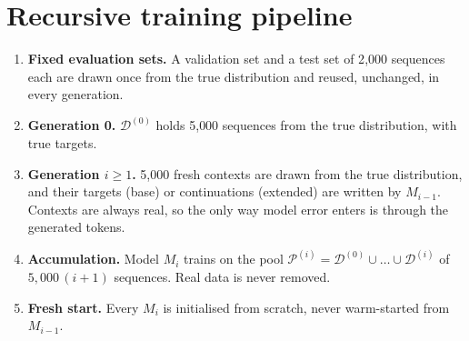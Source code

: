 \documentclass[11pt,a4paper]{article}
\newcommand{\data}[1]{\mathcal{D}^{(#1)}}
\newcommand{\pool}[1]{\mathcal{P}^{(#1)}}
\begin{document}
\section{Recursive training pipeline}\label{sec:pipeline}

\begin{enumerate}[leftmargin=1.6em]
  \item \textbf{Fixed evaluation sets.} A validation set and a test set of
        2{,}000 sequences each are drawn once from the true distribution and
        reused, unchanged, in every generation.
  \item \textbf{Generation 0.} $\data{0}$ holds 5{,}000 sequences from the true
        distribution, with true targets.
  \item \textbf{Generation $i\ge 1$.} 5{,}000 fresh contexts are drawn from the
        true distribution, and their targets (base) or continuations (extended)
        are written by $M_{i-1}$. Contexts are always real, so the only way
        model error enters is through the generated tokens.
  \item \textbf{Accumulation.} Model $M_i$ trains on the pool
        $\pool{i}=\data{0}\cup\dots\cup\data{i}$ of $5{,}000\,(i+1)$ sequences.
        Real data is never removed.
  \item \textbf{Fresh start.} Every $M_i$ is initialised from scratch, never
        warm-started from $M_{i-1}$.
\end{enumerate}
\end{document}
